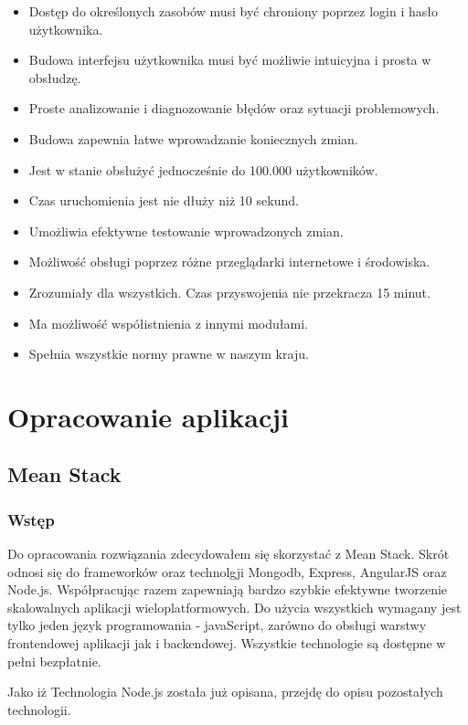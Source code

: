 \documentclass[12pt]{report}
\begin{document}
\begin{itemize}
\item Dostęp do określonych zasobów musi być chroniony poprzez login i hasło użytkownika.
\item Budowa interfejsu użytkownika musi być możliwie intuicyjna i prosta w obsłudzę.
\item Proste analizowanie i diagnozowanie błędów oraz sytuacji problemowych.
\item Budowa zapewnia łatwe wprowadzanie koniecznych zmian.
\item Jest w stanie obsłużyć jednocześnie do 100.000 użytkowników.
\item Czas uruchomienia jest nie dłuży niż 10 sekund.
\item Umożliwia efektywne testowanie wprowadzonych zmian.
\item Możliwość obsługi poprzez różne przeglądarki internetowe i środowiska.
\item Zrozumiały dla wszystkich. Czas przyswojenia nie przekracza 15 minut.
\item Ma możliwość współistnienia z innymi modułami.
\item Spełnia wszystkie normy prawne w naszym kraju.
\end{itemize}

\chapter{Opracowanie aplikacji}

\section{Mean Stack}

\subsection{Wstęp}
Do opracowania rozwiązania zdecydowałem się skorzystać z Mean Stack. 
Skrót odnosi się do frameworków oraz technolgji Mongodb, Express, AngularJS oraz Node.js. 
Współpracując razem zapewniają bardzo szybkie efektywne tworzenie skalowalnych aplikacji wieloplatformowych. 
Do użycia wszystkich wymagany jest tylko jeden język programowania - javaScript, zarówno do obsługi warstwy frontendowej aplikacji jak i backendowej. 
Wszystkie technologie są dostępne w pełni bezpłatnie. 

Jako iż Technologia Node.js została już opisana, przejdę do opisu pozostałych technologii.
\end{document}
